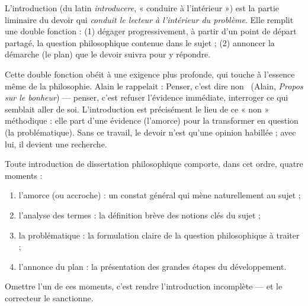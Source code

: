 \documentclass[11pt]{article}
\newcommand{\cle}[1]{{\popxbold\color{popdark}#1}}
\begin{document}
\begin{definition}
L'\cle{introduction} (du latin \emph{introducere}, « conduire à l'intérieur ») est la partie liminaire du devoir qui \emph{conduit le lecteur à l'intérieur du problème}. Elle remplit une double fonction : (1) dégager progressivement, à partir d'un point de départ partagé, la question philosophique contenue dans le sujet ; (2) annoncer la démarche (le plan) que le devoir suivra pour y répondre.
\end{definition}

Cette double fonction obéit à une exigence plus profonde, qui touche à l'essence même de la philosophie. Alain le rappelait : \guillemotleft Penser, c'est dire non \guillemotright\ (Alain, \emph{Propos sur le bonheur}) — penser, c'est refuser l'évidence immédiate, interroger ce qui semblait aller de soi. L'introduction est précisément le lieu de ce « non » méthodique : elle part d'une évidence (l'amorce) pour la transformer en question (la problématique). Sans ce travail, le devoir n'est qu'une opinion habillée ; avec lui, il devient une recherche.

\begin{propriete}
Toute introduction de dissertation philosophique comporte, dans cet ordre, quatre moments :
\begin{enumerate}
\item l'\cle{amorce} (ou accroche) : un constat général qui mène naturellement au sujet ;
\item l'\cle{analyse des termes} : la définition brève des notions clés du sujet ;
\item la \cle{problématique} : la formulation claire de la question philosophique à traiter ;
\item l'\cle{annonce du plan} : la présentation des grandes étapes du développement.
\end{enumerate}
Omettre l'un de ces moments, c'est rendre l'introduction incomplète — et le correcteur le sanctionne.
\end{propriete}
\end{document}
